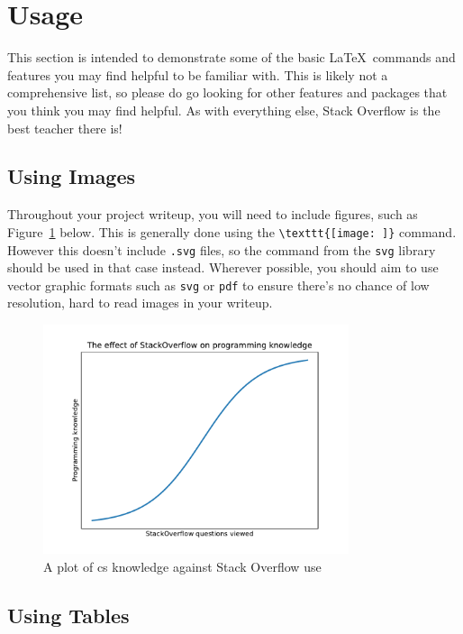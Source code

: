 \section{Usage}
\label{sec:usage}

This section is intended to demonstrate some of the basic \LaTeX\ commands and features you may
find helpful to be familiar with. This is likely not a comprehensive list, so please do go looking
for other features and packages that you think you may find helpful. As with everything else,
Stack Overflow is the best teacher there is!

\subsection{Using Images}

Throughout your project writeup, you will need to include figures, such as
Figure~\ref{fig:stack_overflow} below. This is generally done using the \verb|\texttt{[image: ]}|
command. However this doesn't include \verb|.svg| files, so the \verb|| command from
the \verb|svg| library should be used in that case instead. Wherever possible, you should aim to
use vector graphic formats such as \verb|svg| or \verb|pdf| to ensure there's no chance of low
resolution, hard to read images in your writeup.

\begin{figure}[ht]
	\centering
	\includegraphics[width = 0.8\textwidth]{figures/stackoverflow_plot.pdf}
	\caption{A plot of \acrlong{cs} knowledge against Stack Overflow use}
	\label{fig:stack_overflow}
\end{figure}

\subsection{Using Tables}

